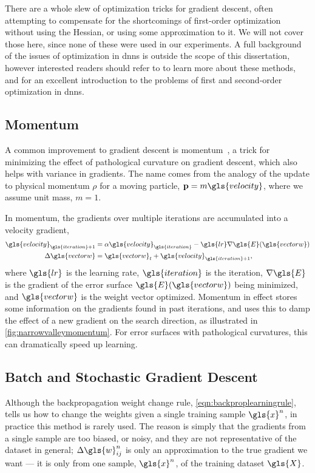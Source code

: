 \documentclass[thesis]{subfiles}
\begin{document}
There are a whole slew of optimization tricks for gradient descent, often attempting to compensate for the shortcomings of first-order optimization without using the Hessian, or using some approximation to it. We will not cover those here, since none of these were used in our experiments. A full background of the issues of optimization in \glspl{dnn} is outside the scope of this dissertation, however interested readers should refer to \citet{goodfellow2016deep} to learn more about these methods, and \citet{martens2010deep} for an excellent introduction to the problems of first and second-order optimization in \glspl{dnn}.

\subsection{Momentum}
A common improvement to gradient descent is momentum~\citep{polyak1964some,rumelhartbackprop}, a trick for minimizing the effect of pathological curvature on gradient descent, which also helps with variance in gradients. The name comes from the analogy of the update to physical momentum $\rho$ for a moving particle, $\mathbf{p}=m\gls{velocity}$, where we assume unit mass, $m=1$.

In momentum, the gradients over multiple iterations are accumulated into a velocity gradient, 
\begin{equation}
\begin{aligned}
\gls{velocity}_{\gls{iteration}+1} &= \alpha \gls{velocity}_{\gls{iteration}} - \gls{lr}\nabla \gls{E}(\gls{vectorw})\\
\Delta\gls{vectorw} &= \gls{vectorw}_t + \gls{velocity}_{\gls{iteration}+1},
\end{aligned}
\end{equation}
where $\gls{lr}$ is the learning rate, $\gls{iteration}$ is the iteration,  $\nabla \gls{E}$ is the gradient of the error surface $\gls{E}(\gls{vectorw})$ being minimized, and $\gls{vectorw}$ is the weight vector optimized. Momentum in effect stores some information on the gradients found in past iterations, and uses this to damp the effect of a new gradient on the search direction, as illustrated in \cref{fig:narrowvalleymomentum}. For error surfaces with pathological curvatures, this can dramatically speed up learning.

\subsection{Batch and Stochastic Gradient Descent}
Although the backpropagation weight change rule, \cref{eqn:backproplearningrule}, tells us how to change the weights given a single training sample $\gls{x}^n$, in practice this method is rarely used. The reason is simply that the gradients from a single sample are too biased, or noisy, and they are not representative of the dataset in general; $\Delta \gls{w}^n_{ij}$ is only an approximation to the true gradient we want --- it is only from one sample, $\gls{x}^n$, of the training dataset $\gls{X}$. 
\end{document}
